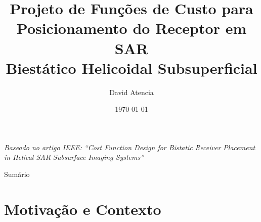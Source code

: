 \documentclass[aspectratio=169, 10pt]{beamer}
\title[Funções de Custo --- SAR Biestático]{%
  Projeto de Funções de Custo para\\[0.3em]
  Posicionamento do Receptor em SAR\\[0.3em]
  Biestático Helicoidal Subsuperficial}
\author[D.\ Atencia]{David Atencia}
\institute[Doutoramento SAR]{Programa de Doutoramento em Engenharia Elétrica}
\date{\today}
\begin{document}

{
\begin{frame}
  \titlepage
  \vspace{-0.8em}
  \begin{center}
    \small\textit{Baseado no artigo IEEE:
    ``Cost Function Design for Bistatic Receiver Placement
    in Helical SAR Subsurface Imaging Systems''}
  \end{center}
\end{frame}
}

\begin{frame}{Sumário}
  \tableofcontents
\end{frame}

\section{Motivação e Contexto}
\end{document}
